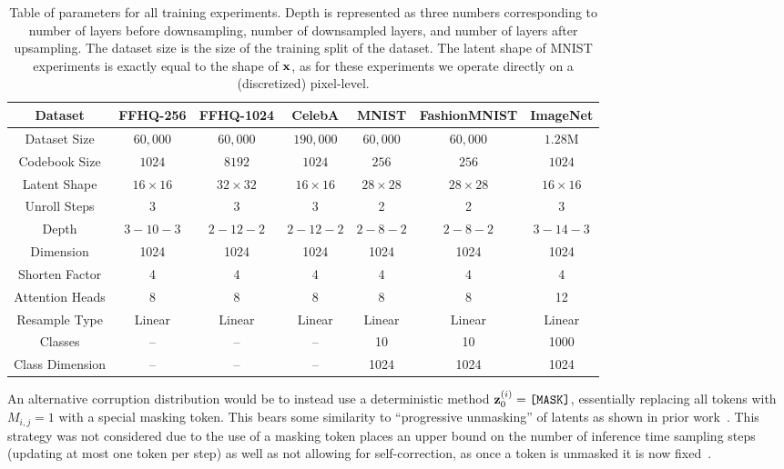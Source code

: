 \begin{table}
    \centering
    \begin{tabular}{|c||c c||c||c c||c||}
    \hline
    \textbf{Dataset} & \textbf{FFHQ-256} & \textbf{FFHQ-1024} & \textbf{CelebA}
                     & \textbf{MNIST} & \textbf{FashionMNIST} &
                     \textbf{ImageNet} \\
    \hline
    Dataset Size & $60,000$ & $60,000$ & $190,000$ & $60,000$ & $60,000$ & $1.28$M \\
    Codebook Size & $1024$ & $8192$ & $1024$ & $256$ & $256$ & $1024$ \\
    Latent Shape & $16 \times 16$ & $32 \times 32$ & $16 \times 16$ & $28 \times
                 28$ & $28 \times 28$ & $16 \times 16$ \\
    Unroll Steps & 3 & 3 & 3 & 2 & 2 & 3 \\
    \hline
    Depth & $3-10-3$ & $2-12-2$ & $2-12-2$ & $2-8-2$ & $2-8-2$ & $3-14-3$\\
    Dimension & 1024 & 1024 & 1024 & 1024 & 1024 & 1024 \\
    Shorten Factor & 4 & 4 & 4 & 4 & 4 & 4 \\
    Attention Heads & 8 & 8 & 8 & 8 & 8 & 12 \\
    Resample Type & Linear & Linear & Linear & Linear & Linear & Linear \\
    \hline
    Classes & -- & -- & -- & 10 & 10 & 1000 \\
    Class Dimension & -- & -- & -- & 1024 & 1024 & 1024 \\
    \hline
    \end{tabular}
    \caption{
        Table of parameters for all training experiments. Depth is
        represented as three numbers corresponding to number of layers before
        downsampling, number of downsampled layers, and number of layers after
        upsampling. The dataset size is the size of the training split of the
        dataset. The latent shape of MNIST experiments is exactly equal to the
        shape of $\mathbf{x}$, as for these experiments we operate directly on a
        (discretized) pixel-level.
    }
\end{table}
An alternative corruption distribution would be to instead use a deterministic
method $\mathbf{z}_0^{(i)}=\texttt{[MASK]}$, essentially replacing all tokens with
$M_{i,j} = 1$ with a special masking token. This bears some similarity to
``progressive unmasking'' of latents as shown in prior
work~\cite{bondtaylor2021unleashing,austin2021structured}. This strategy was not
considered due to the use of a masking token places an upper bound on the number of
inference time sampling steps (updating at most one token per step) as well as
not allowing for self-correction, as once a token is unmasked it is now
fixed~\cite{bondtaylor2021unleashing,austin2021structured}. 

